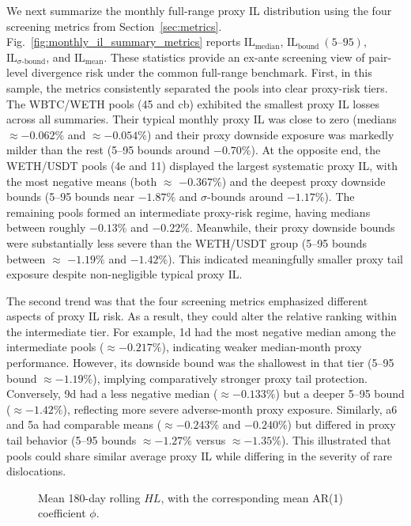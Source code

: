 \documentclass[anonymous]{lipics-v2021}
\begin{document}
{We next summarize the monthly full-range proxy IL distribution using the four screening metrics from Section~\ref{sec:metrics}. Fig.~\ref{fig:monthly_il_summary_metrics} reports $\mathrm{IL}_{\text{median}}$, $\mathrm{IL}_{\text{bound}}~(5\text{--}95)$, $\mathrm{IL}_{\sigma\text{-bound}}$, and $\mathrm{IL}_{\text{mean}}$. These statistics provide an ex-ante screening view of pair-level divergence risk under the common full-range benchmark.
First, in this sample, the metrics consistently separated the pools into clear proxy-risk tiers. The WBTC/WETH pools (45 and cb) exhibited the smallest proxy IL losses across all summaries. Their typical monthly proxy IL was close to zero (medians $\approx-0.062\%$ and $\approx-0.054\%$) and their proxy downside exposure was markedly milder than the rest (5--95 bounds around $-0.70\%$). At the opposite end, the WETH/USDT pools (4e and 11) displayed the largest systematic proxy IL, with the most negative means (both $\approx$ $-0.367\%$) and the deepest proxy downside bounds (5--95 bounds near $-1.87\%$ and $\sigma$-bounds around $-1.17\%$). 
The remaining pools formed an intermediate proxy-risk regime, having medians between roughly $-0.13\%$ and $-0.22\%$. Meanwhile, their proxy downside bounds were substantially less severe than the WETH/USDT group (5--95 bounds between $\approx$ $-1.19\%$ and $-1.42\%$). This indicated meaningfully smaller proxy tail exposure despite non-negligible typical proxy IL.

The second trend was that the four screening metrics emphasized different aspects of proxy IL risk. 
As a result, they could alter the relative ranking within the intermediate tier. 
For example, 1d had the most negative median among the intermediate pools ($\approx-0.217\%$), indicating weaker median-month proxy performance. 
However, its downside bound was the shallowest in that tier (5--95 bound $\approx-1.19\%$), implying comparatively stronger proxy tail protection. 
Conversely, 9d had a less negative median ($\approx-0.133\%$) but a deeper 5--95 bound ($\approx-1.42\%$), reflecting more severe adverse-month proxy exposure. 
Similarly, a6 and 5a had comparable means ($\approx-0.243\%$ and $-0.240\%$) but differed in proxy tail behavior (5--95 bounds $\approx-1.27\%$ versus $\approx-1.35\%$). 
This illustrated that pools could share similar average proxy IL while differing in the severity of rare dislocations.


\begin{figure}[t]
\centering
\resizebox{0.5\textwidth}{!}{%
        
    }
\caption{Mean 180-day rolling $HL$, with the corresponding mean AR(1) coefficient $\phi$.}
\label{fig:half_life_180d_mean_phi_inside}
\end{figure}

}
\end{document}
